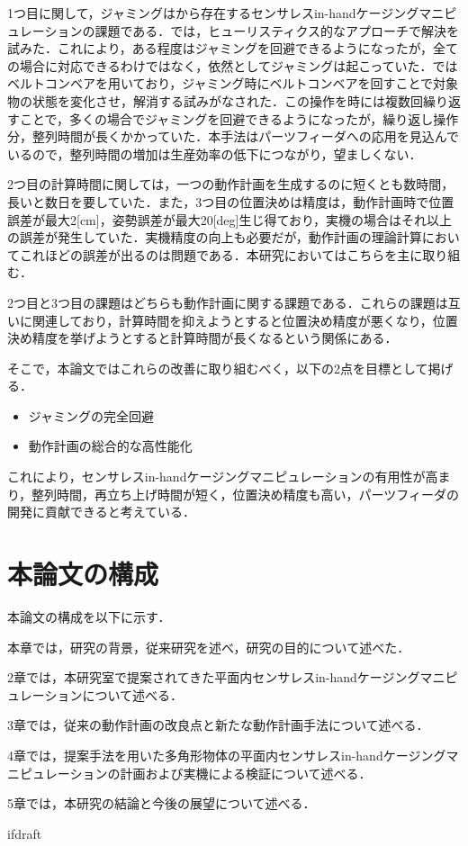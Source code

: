 \documentclass[a4paper,twoside,12pt,papersize, dvipdfmx]{iirthesis}
\begin{document}
1つ目に関して，ジャミングは\cite{asamura2013}から存在するセンサレスin-handケージングマニピュレーションの課題である．\cite{komiyama2021}では，ヒューリスティクス的なアプローチで解決を試みた．これにより，ある程度はジャミングを回避できるようになったが，全ての場合に対応できるわけではなく，依然としてジャミングは起こっていた．\cite{kamikukita2022}ではベルトコンベアを用いており，ジャミング時にベルトコンベアを回すことで対象物の状態を変化させ，解消する試みがなされた．この操作を時には複数回繰り返すことで，多くの場合でジャミングを回避できるようになったが，繰り返し操作分，整列時間が長くかかっていた．本手法はパーツフィーダへの応用を見込んでいるので，整列時間の増加は生産効率の低下につながり，望ましくない．

2つ目の計算時間に関しては，一つの動作計画を生成するのに短くとも数時間，長いと数日を要していた．また，3つ目の位置決めは精度は，動作計画時で位置誤差が最大2[cm]，姿勢誤差が最大20[deg]生じ得ており，実機の場合はそれ以上の誤差が発生していた．実機精度の向上も必要だが，動作計画の理論計算においてこれほどの誤差が出るのは問題である．本研究においてはこちらを主に取り組む．

2つ目と3つ目の課題はどちらも動作計画に関する課題である．これらの課題は互いに関連しており，計算時間を抑えようとすると位置決め精度が悪くなり，位置決め精度を挙げようとすると計算時間が長くなるという関係にある．

そこで，本論文ではこれらの改善に取り組むべく，以下の2点を目標として掲げる．
\begin{itemize}
\item ジャミングの完全回避
\item 動作計画の総合的な高性能化
\end{itemize}
これにより，センサレスin-handケージングマニピュレーションの有用性が高まり，整列時間，再立ち上げ時間が短く，位置決め精度も高い，パーツフィーダの開発に貢献できると考えている．

\section{本論文の構成}\label{sec::intro::configuration}
本論文の構成を以下に示す．\par
本章では，研究の背景，従来研究を述べ，研究の目的について述べた．\par
2章では，本研究室で提案されてきた平面内センサレスin-handケージングマニピュレーションについて述べる．\par
3章では，従来の動作計画の改良点と新たな動作計画手法について述べる．\par
4章では，提案手法を用いた多角形物体の平面内センサレスin-handケージングマニピュレーションの計画および実機による検証について述べる．\par
5章では，本研究の結論と今後の展望について述べる．


\expandafter\ifx\csname ifdraft\endcsname\relax
    
\end{document}
